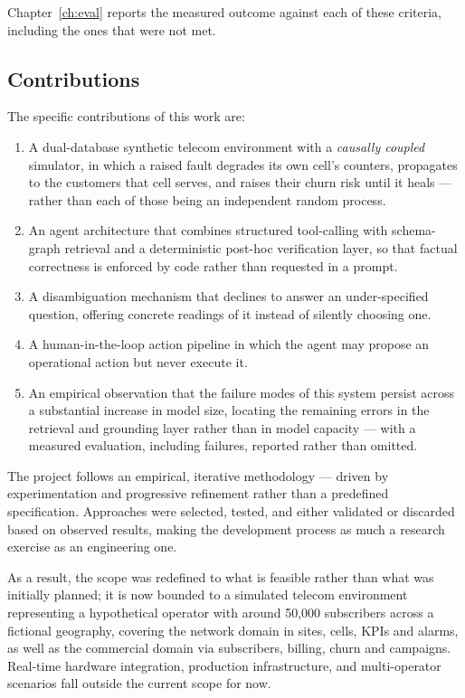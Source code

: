 Chapter~\ref{ch:eval} reports the measured outcome against each of these criteria,
including the ones that were not met.

\subsection*{Contributions}

The specific contributions of this work are:
\begin{enumerate}
    \item A dual-database synthetic telecom environment with a \emph{causally coupled}
    simulator, in which a raised fault degrades its own cell's counters, propagates to
    the customers that cell serves, and raises their churn risk until it heals ---
    rather than each of those being an independent random process.
    \item An agent architecture that combines structured tool-calling with
    schema-graph retrieval and a deterministic post-hoc verification layer, so that
    factual correctness is enforced by code rather than requested in a prompt.
    \item A disambiguation mechanism that declines to answer an under-specified
    question, offering concrete readings of it instead of silently choosing one.
    \item A human-in-the-loop action pipeline in which the agent may propose an
    operational action but never execute it.
    \item An empirical observation that the failure modes of this system persist
    across a substantial increase in model size, locating the remaining errors in the
    retrieval and grounding layer rather than in model capacity --- with a measured
    evaluation, including failures, reported rather than omitted.
\end{enumerate}


The project follows an empirical, iterative methodology — driven by experimentation and progressive refinement rather than a predefined specification. Approaches were selected, tested, and either validated or discarded based on observed results, making the development process as much a research exercise as an engineering one.

As a result, the scope was redefined to what is feasible rather than what was initially planned; it is now bounded to a simulated telecom environment representing a hypothetical operator with around 50{,}000 subscribers across a fictional geography, covering the network domain in sites, cells, KPIs and alarms, as well as the commercial domain via subscribers, billing, churn and campaigns. Real-time hardware integration, production infrastructure, and multi-operator scenarios fall outside the current scope for now.

